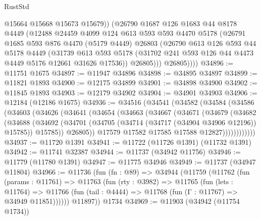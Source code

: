 \begin{lexlean}{RustStd}
\begin{coremodule}
              @15664
              @15668
              @15673
              @15679))
          (@26790
            @1687
            @126
            @1683
            @44
            @8178
            @4449
            (@12488
              @24459
              @4099
              @124
              @613
              @593
              @593
              @4470
              @5178
              (@26791
                @1685
                @593
                @876
                @4470
                (@5179 @4449)
                @26803
                (@26790
                  @613
                  @126
                  @593
                  @44
                  @5178
                  @4449
                  (@31739
                    @613
                    @593
                    @5178
                    (@31702 @241 @593 @126 @44 @4473 @4449 @5176 @12661 @31626 @17536))
                  @26805)))
            @26805))))
@34896 := @11751 @1675
@34897 := @11947 @34896
@34898 := @34895 @34897
@34899 := @11821 @1893
@34900 := @12175 @34899
@34901 := @34898 @34900
@34902 := @11845 @1893
@34903 := @12179 @34902
@34904 := @34901 @34903
@34906 := @12184 (@12186 @1675)
@34936 := @34516
    (@34541
      (@34582
        (@34584
          (@34586
            (@34603
              (@34626
                (@34641
                  (@34654
                    (@34663
                      (@34667
                        (@34671
                          (@34679
                            (@34682
                              (@34688
                                (@34692
                                  (@34701
                                    (@34705 (@34714 (@34717 (@34904 @34906 @12196)) @15785))
                                    @15785))
                                @26805))
                            @17579
                            @17582
                            @17585
                            @17588
                            @12827))))))))))))
@34937 := @11720 @1391
@34941 := @11722 (@11726 @1391) (@11732 @1391)
@34942 := @11741 @32387
@34944 := @11737 (@34942 @11756)
@34946 := @11779 (@11780 @1391)
@34947 := @11775 @34946
@34949 := @11737 (@34947 @11804)
@34966 := @11736
    (fun (fn : @89) =>
    @34944
      (@11759
        (@11762
          (fun (params : @11761) =>
          @11763
            (fun (rty : @3982) =>
            @11765
              (fun (lets : @11764) =>
              @11766 (fun (tail : @4444) => @11768 (fun (Γ : @11767) => @34949 @11851))))))
        @11897))
    @1734
@34969 := @11903 (@34942 (@11754 @1734))

\end{coremodule}
\end{lexlean}
